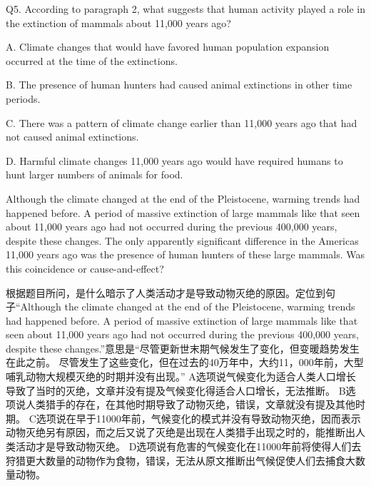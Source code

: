 \begin{blk}
    \begin{qst}
        Q5.
        According to paragraph 2, what suggests that human activity played a role in the extinction of mammals about 11,000 years ago?
    \end{qst}

    \begin{chc}
        A.
        Climate changes that would have favored human population expansion occurred at the time of the extinctions.

        B.
        The presence of human hunters had caused animal extinctions in other time periods.

        C.
        There was a pattern of climate change earlier than 11,000 years ago that had not caused animal extinctions.

        D.
        Harmful climate changes 11,000 years ago would have required humans to hunt larger numbers of animals for food.
    \end{chc}

    \begin{psgq}
        Although the climate changed at the end of the Pleistocene, warming trends had happened before. A period of massive extinction of large mammals like that seen about 11,000 years ago had not occurred during the previous 400,000 years, despite these changes. The only apparently significant difference in the Americas 11,000 years ago was the presence of human hunters of these large mammals. Was this coincidence or cause-and-effect?
    \end{psgq}

    \begin{nlz}
        根据题目所问，是什么暗示了人类活动才是导致动物灭绝的原因。定位到句子“Although the climate changed at the end of the Pleistocene, warming trends had happened before. A period of massive extinction of large mammals like that seen about 11,000 years ago had not occurred during the previous 400,000 years, despite these changes.”意思是“尽管更新世末期气候发生了变化，但变暖趋势发生在此之前。 尽管发生了这些变化，但在过去的40万年中，大约11，000年前，大型哺乳动物大规模灭绝的时期并没有出现。” A选项说气候变化为适合人类人口增长导致了当时的灭绝，文章并没有提及气候变化得适合人口增长，无法推断。 B选项说人类猎手的存在，在其他时期导致了动物灭绝，错误，文章就没有提及其他时期。 C选项说在早于11000年前，气候变化的模式并没有导致动物灭绝，因而表示动物灭绝另有原因，而之后又说了灭绝是出现在人类猎手出现之时的，能推断出人类活动才是导致动物灭绝。 D选项说有危害的气候变化在11000年前将使得人们去狩猎更大数量的动物作为食物，错误，无法从原文推断出气候促使人们去捕食大数量动物。
    \end{nlz}
\end{blk}

